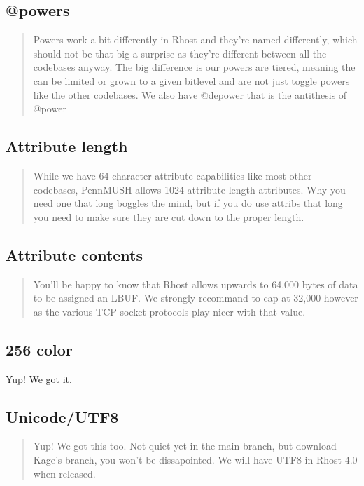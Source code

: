 \documentclass[letterpaper,10pt,english]{sphinxmanual}
\begin{document}
\subsection{@powers}
\label{\detokenize{differences:powers}}\begin{quote}

\sphinxAtStartPar
Powers work a bit differently in Rhost and they’re named
differently, which should not be that big a surprise as they’re different
between all the codebases anyway.  The big difference is our powers are
tiered, meaning the can be limited or grown to a given bitlevel and are
not just toggle powers like the other codebases.  We also have @depower
that is the anti\sphinxhyphen{}thesis of @power
\end{quote}


\subsection{Attribute length}
\label{\detokenize{differences:attribute-length}}\begin{quote}

\sphinxAtStartPar
While we have 64 character attribute capabilities like
most other codebases, PennMUSH allows 1024 attribute length attributes.
Why you need one that long boggles the mind, but if you do use attribs
that long you need to make sure they are cut down to the proper length.
\end{quote}


\subsection{Attribute contents}
\label{\detokenize{differences:attribute-contents}}\begin{quote}

\sphinxAtStartPar
You’ll be happy to know that Rhost allows upwards
to 64,000 bytes of data to be assigned an LBUF.  We strongly recommand
to cap at 32,000 however as the various TCP socket protocols play nicer
with that value.
\end{quote}


\subsection{256 color}
\label{\detokenize{differences:color}}
\sphinxAtStartPar
Yup!  We got it.


\subsection{Unicode/UTF8}
\label{\detokenize{differences:unicode-utf8}}\begin{quote}

\sphinxAtStartPar
Yup!  We got this too.  Not quiet yet in the main branch,
but download Kage’s branch, you won’t be dissapointed.  We will have
UTF8 in Rhost 4.0 when released.
\end{quote}
\end{document}
